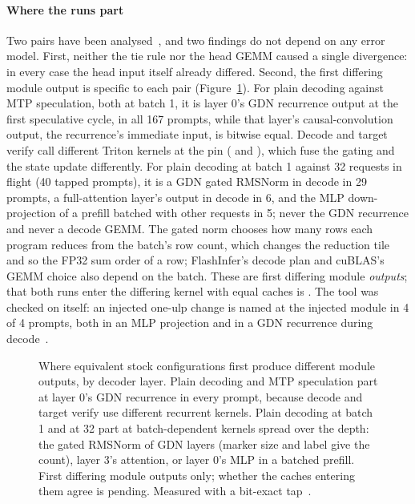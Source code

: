 \paragraph{Where the runs part} Two pairs have been analysed~, and two findings do not depend on any error model. First, neither the tie rule nor the head GEMM caused a single divergence: in every case the head input itself already differed. Second, the first differing module output is specific to each pair (Figure~\ref{fig:divergence}). For plain decoding against MTP speculation, both at batch 1, it is layer 0's GDN recurrence output at the first speculative cycle, in all 167 prompts, while that layer's causal-convolution output, the recurrence's immediate input, is bitwise equal. Decode and target verify call different Triton kernels at the pin ( and ), which fuse the gating and the state update differently. For plain decoding at batch 1 against 32 requests in flight (40 tapped prompts), it is a GDN gated RMSNorm in decode in 29 prompts, a full-attention layer's output in decode in 6, and the MLP down-projection of a prefill batched with other requests in 5; never the GDN recurrence and never a decode GEMM. The gated norm chooses how many rows each program reduces from the batch's row count, which changes the reduction tile and so the FP32 sum order of a row; FlashInfer's decode plan and cuBLAS's GEMM choice also depend on the batch. These are first differing module \emph{outputs}; that both runs enter the differing kernel with equal caches is . The tool was checked on itself: an injected one-ulp change is named at the injected module in 4 of 4 prompts, both in an MLP projection and in a GDN recurrence during decode~.

\begin{figure}[tbp]
\centering

\caption{Where equivalent stock configurations first produce different module outputs, by decoder layer. Plain decoding and MTP speculation part at layer 0's GDN recurrence in every prompt, because decode and target verify use different recurrent kernels. Plain decoding at batch 1 and at 32 part at batch-dependent kernels spread over the depth: the gated RMSNorm of GDN layers (marker size and label give the count), layer 3's attention, or layer 0's MLP in a batched prefill. First differing module outputs only; whether the caches entering them agree is pending. Measured with a bit-exact tap~.}
\label{fig:divergence}
\end{figure}

